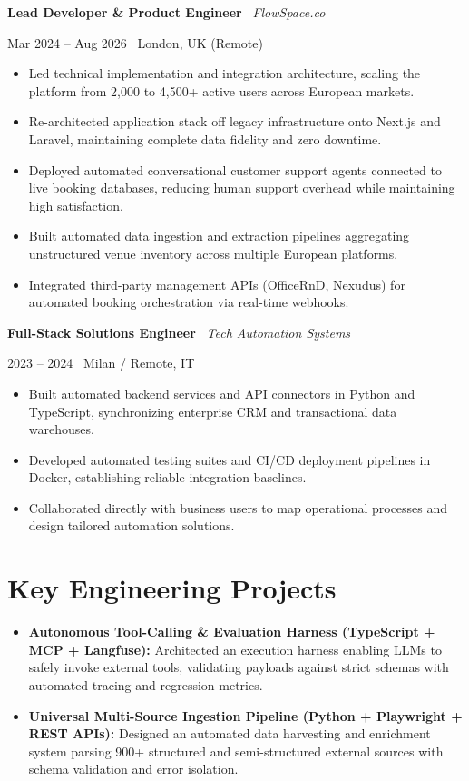 \documentclass[a4paper,10pt]{article}
\newcommand{\role}[4]{%
  \vspace{2pt}\noindent
  \begin{minipage}[t]{0.70\textwidth}\raggedright\textbf{#1} \textbullet\ \textit{#3}\end{minipage}%
  \hfill
  \begin{minipage}[t]{0.28\textwidth}\raggedleft\footnotesize\color{gray}#2 \textbullet\ #4\end{minipage}%
  \vspace{1pt}%
}
\begin{document}
\vspace{3pt}
\role{Lead Developer \& Product Engineer}{Mar 2024 -- Aug 2026}{FlowSpace.co}{London, UK (Remote)}
\begin{itemize}
  \item Led technical implementation and integration architecture, scaling the platform from 2,000 to 4,500+ active users across European markets.
  \item Re-architected application stack off legacy infrastructure onto Next.js and Laravel, maintaining complete data fidelity and zero downtime.
  \item Deployed automated conversational customer support agents connected to live booking databases, reducing human support overhead while maintaining high satisfaction.
  \item Built automated data ingestion and extraction pipelines aggregating unstructured venue inventory across multiple European platforms.
  \item Integrated third-party management APIs (OfficeRnD, Nexudus) for automated booking orchestration via real-time webhooks.
\end{itemize}

\vspace{3pt}
\role{Full-Stack Solutions Engineer}{2023 -- 2024}{Tech Automation Systems}{Milan / Remote, IT}
\begin{itemize}
  \item Built automated backend services and API connectors in Python and TypeScript, synchronizing enterprise CRM and transactional data warehouses.
  \item Developed automated testing suites and CI/CD deployment pipelines in Docker, establishing reliable integration baselines.
  \item Collaborated directly with business users to map operational processes and design tailored automation solutions.
\end{itemize}

\section{Key Engineering Projects}
\begin{itemize}
  \item \textbf{Autonomous Tool-Calling \& Evaluation Harness (TypeScript + MCP + Langfuse):} Architected an execution harness enabling LLMs to safely invoke external tools, validating payloads against strict schemas with automated tracing and regression metrics.
  \item \textbf{Universal Multi-Source Ingestion Pipeline (Python + Playwright + REST APIs):} Designed an automated data harvesting and enrichment system parsing 900+ structured and semi-structured external sources with schema validation and error isolation.
\end{itemize}
\end{document}
